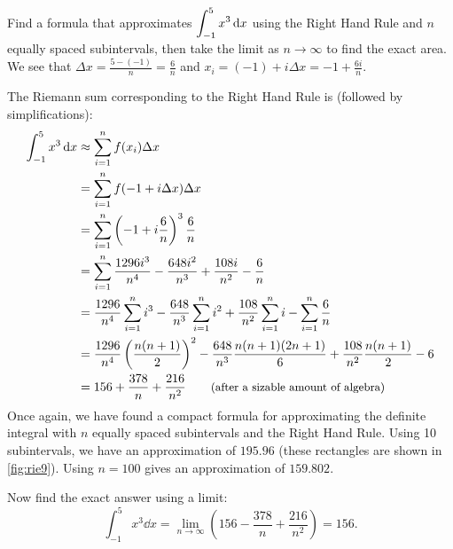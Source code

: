 \begin{example}\label{ex_rie10}%
Find a formula that approximates $\displaystyle\int_{-1}^5 x^3\operatorname{d}\! x$ using the Right Hand Rule and $n$ equally spaced subintervals, then take the limit as $n\to\infty$ to find the exact area.
\solution
We see that %
$\Delta x = \frac{5-(-1)}{n} = \frac6n$ and $x_i = (-1) + i\Delta x=-1+\frac{6i}n$.

The Riemann sum corresponding to the Right Hand Rule is (followed by simplifications):
\begin{align*}
	\int_{-1}^5 x^3\dd x %
	&\approx \sum_{i=1}^n f(x_i)\Delta x \\
	&= \sum_{i=1}^n f(-1+i\Delta x)\Delta x \\
	&= \sum_{i=1}^n \left(-1+i\frac6n\right)^3\frac6n \\
	&= \sum_{i=1}^n \frac{1296 i^3}{n^4}-\frac{648 i^2}{n^3}+\frac{108 i}{n^2}-\frac6n \\
	&= \frac{1296}{n^4}\sum_{i=1}^n i^3 -\frac{648}{n^3}\sum_{i=1}^n i^2+\frac{108}{n^2}\sum_{i=1}^n i-\sum_{i=1}^n\frac6n \\
	&= \frac{1296}{n^4}\left(\frac{n(n+1)}{2}\right)^2 -\frac{648}{n^3}\frac{n(n+1)(2n+1)}{6}+\frac{108}{n^2}\frac{n(n+1)}{2}-6 \\
	&=156 + \frac{378}n + \frac{216}{n^2} \qquad\text{\small (after a sizable amount of algebra)}
\end{align*}
Once again, we have found a compact formula for approximating the definite integral with $n$ equally spaced subintervals and the Right Hand Rule. Using 10 subintervals, we have an approximation of $195.96$ (these rectangles are shown in \autoref{fig:rie9}). Using $n=100$ gives an approximation of $159.802$. 


Now find the exact answer using a limit:
\[
\int_{-1}^5 x^3\dd x
= \lim_{n\to\infty} \left(156 - \frac{378}n + \frac{216}{n^2}\right) = 156.
\]
\end{example}

